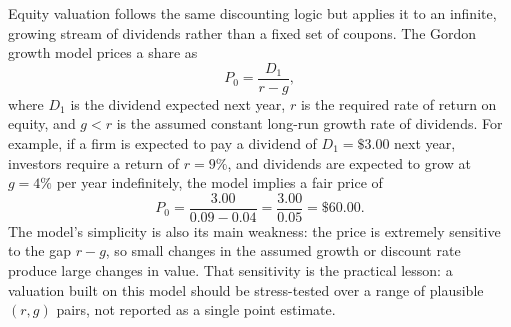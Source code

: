 \documentclass[../ai_in_finance]{subfiles}
\begin{document}
Equity valuation follows the same discounting logic but applies it to an infinite, growing stream of dividends rather than a fixed set of coupons. The Gordon growth model prices a share as
\begin{equation}
P_0 = \frac{D_1}{r - g},\label{eq:valuation-gordon}
\end{equation}
where $D_1$ is the dividend expected next year, $r$ is the required rate of return on equity, and $g < r$ is the assumed constant long-run growth rate of dividends. For example, if a firm is expected to pay a dividend of $D_1 = \$3.00$ next year, investors require a return of $r = 9\%$, and dividends are expected to grow at $g = 4\%$ per year indefinitely, the model implies a fair price of
\begin{equation*}
P_0 = \frac{3.00}{0.09 - 0.04} = \frac{3.00}{0.05} = \$60.00.
\end{equation*}
The model's simplicity is also its main weakness: the price is extremely sensitive to the gap $r-g$, so small changes in the assumed growth or discount rate produce large changes in value. That sensitivity is the practical lesson: a valuation built on this model should be stress-tested over a range of plausible $(r,g)$ pairs, not reported as a single point estimate.
\end{document}
